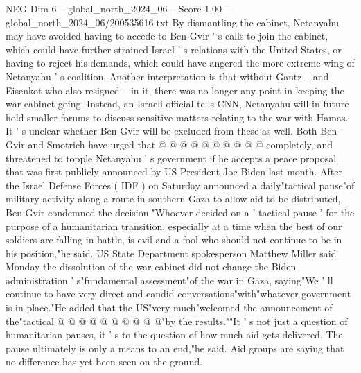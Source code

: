 \begin{textsample}{NEG Dim 6 – global\_north\_2024\_06 – Score 1.00 – global\_north\_2024\_06/200535616.txt}
By dismantling the cabinet, Netanyahu may have avoided having to accede to Ben-Gvir ' s calls to join the cabinet, which could have further strained Israel ' s relations with the United States, or having to reject his demands, which could have angered the more extreme wing of Netanyahu ' s coalition.
Another interpretation is that without Gantz -- and Eisenkot who also resigned -- in it, there was no longer any point in keeping the war cabinet going.
Instead, an Israeli official tells CNN, Netanyahu will in future hold smaller forums to discuss sensitive matters relating to the war with Hamas.
It ' s unclear whether Ben-Gvir will be excluded from these as well.
Both Ben-Gvir and Smotrich have urged that @ @ @ @ @ @ @ @ @ @ completely, and threatened to topple Netanyahu ' s government if he accepts a peace proposal that was first publicly announced by US President Joe Biden last month.
After the Israel Defense Forces ( IDF ) on Saturday announced a daily"tactical pause"of military activity along a route in southern Gaza to allow aid to be distributed, Ben-Gvir condemned the decision."Whoever decided on a ' tactical pause ' for the purpose of a humanitarian transition, especially at a time when the best of our soldiers are falling in battle, is evil and a fool who should not continue to be in his position,"he said.
US State Department spokesperson Matthew Miller said Monday the dissolution of the war cabinet did not change the Biden administration ' s"fundamental assessment"of the war in Gaza, saying"We ' ll continue to have very direct and candid conversations"with"whatever government is in place."He added that the US"very much"welcomed the announcement of the"tactical @ @ @ @ @ @ @ @ @ @"by the results.""It ' s not just a question of humanitarian pauses, it ' s to the question of how much aid gets delivered.
The pause ultimately is only a means to an end,"he said.
Aid groups are saying that no difference has yet been seen on the ground.

\end{textsample}
